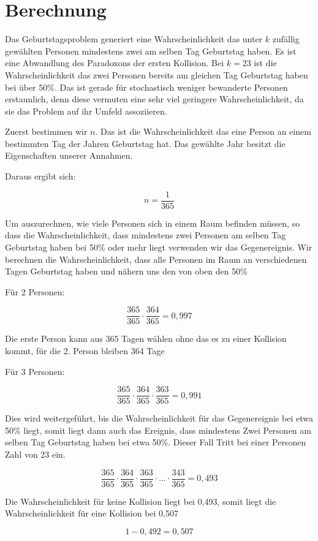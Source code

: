 \documentclass[../main.tex]{subfiles}
\begin{document}
\section{Berechnung}

Das Geburtstagsproblem generiert eine Wahrscheinlichkeit das unter \(k\) zufällig gewählten Personen mindestens zwei am
selben Tag Geburtstag haben. Es ist eine Abwandlung des Paradoxons der ersten Kollision. \cite{henze} Bei \(k=23\) ist die
Wahrscheinlichkeit das zwei Personen bereits am gleichen Tag Geburtstag haben bei über 50\%. Das ist gerade für
stochastisch weniger bewanderte Personen erstaunlich, denn diese vermuten eine sehr viel geringere Wahrscheinlichkeit,
da sie das Problem auf ihr Umfeld assoziieren.

Zuerst bestimmen wir \(n\). Das ist die Wahrscheinlichkeit das eine Person an einem bestimmten Tag der Jahren Geburtstag hat.
Das gewählte Jahr besitzt die Eigenschaften unserer Annahmen.

Daraus ergibt sich:

\begin{equation}
n = \frac{1}{365}
\end{equation}

Um auszurechnen, wie viele Personen sich in einem Raum befinden müssen, so dass die Wahrscheinlichkeit, dass mindestens zwei Personen am selben Tag Geburtstag haben bei 50\% oder mehr liegt verwenden wir das Gegenereignis. Wir berechnen die Wahrscheinlichkeit, dass alle Personen im Raum an verschiedenen Tagen Geburtstag haben und nähern uns den von oben den 50\%

Für 2 Personen:

\begin{equation}
 \frac{365}{365} \cdot \frac{364}{365} = 0,997
\end{equation}

Die erste Person kann aus 365 Tagen wählen ohne das es zu einer Kollision kommt, für die 2. Person bleiben 364 Tage

Für 3 Personen:

\begin{equation}
 \frac{365}{365} \cdot \frac{364}{365} \cdot \frac{363}{365} = 0,991
\end{equation}

Dies wird weitergeführt, bis die Wahrscheinlichkeit für das Gegenereignis bei etwa 50\% liegt, somit liegt dann auch das Ereignis, dass mindestens Zwei Personen am selben Tag Geburtstag haben bei etwa 50\%. Dieser Fall Tritt bei einer Personen Zahl von 23 ein.

\begin{equation}
 \frac{365}{365} \cdot \frac{364}{365} \cdot \frac{363}{365} \cdot ... \cdot \frac{343}{365} = 0,493
\end{equation}

Die Wahrscheinlichkeit für keine Kollision liegt bei 0,493, somit liegt die Wahrscheinlichkeit für eine Kollision bei 0,507

\begin{equation}
 1-0,492 = 0,507
\end{equation}
\end{document}
